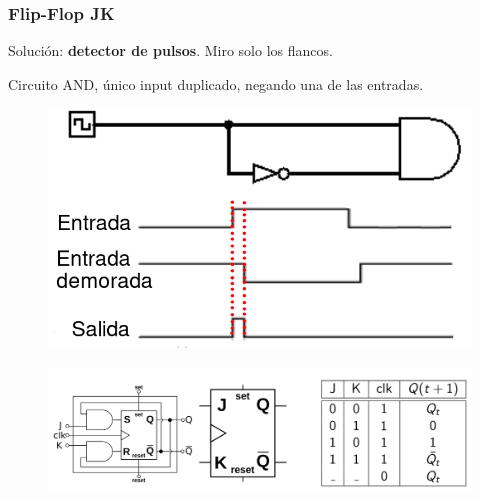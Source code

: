 \documentclass[10pt]{beamer}
\begin{document}
\begin{frame}
\frametitle{Flip-Flop JK}

Solución: \textbf{detector de pulsos}. Miro solo los flancos.

Circuito AND, único input duplicado,  negando una de las entradas.
\begin{figure}[h!]
    \centering
    \includegraphics[scale=0.2]{delay.png}
\end{figure}

\pause

\begin{figure}[h!]
    \centering
    \includegraphics[scale=0.2]{flipJK.png}
\end{figure}


\end{frame}
%
%
%
%
%
\end{document}
